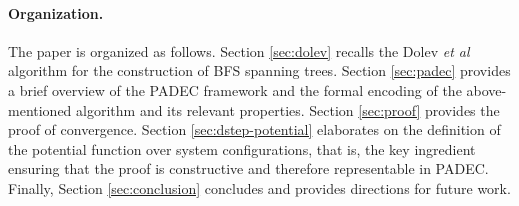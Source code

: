 \paragraph{Organization.} The paper is organized as follows.
Section \ref{sec:dolev} recalls the Dolev \emph{et al} algorithm for
the construction of BFS spanning trees.  Section \ref{sec:padec}
provides a brief overview of the PADEC framework and the formal
encoding of the above-mentioned algorithm and its relevant properties.
Section \ref{sec:proof} provides the proof of convergence.  Section
\ref{sec:dstep-potential} elaborates on the definition of the
potential function over system configurations, that is, the key
ingredient ensuring that the proof is constructive and therefore
representable in PADEC.  Finally, Section \ref{sec:conclusion}
concludes and provides directions for future work.
